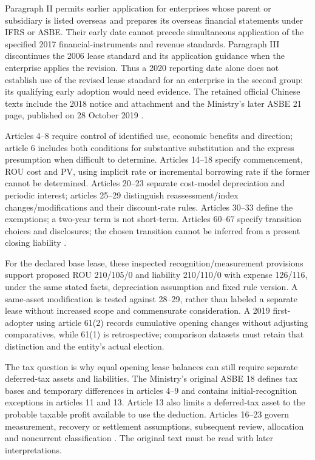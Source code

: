 Paragraph II permits earlier application for enterprises whose parent or subsidiary is listed overseas and prepares its overseas financial statements under IFRS or ASBE. Their early date cannot precede simultaneous application of the specified 2017 financial-instruments and revenue standards. Paragraph III discontinues the 2006 lease standard and its application guidance when the enterprise applies the revision. Thus a 2020 reporting date alone does not establish use of the revised lease standard for an enterprise in the second group: its qualifying early adoption would need evidence. The retained official Chinese texts include the 2018 notice and attachment and the Ministry's later ASBE 21 page, published on 28 October 2019 \citep{moflease2018,mofasbe21}.

Articles 4--8 require control of identified use, economic benefits and direction; article 6 includes both conditions for substantive substitution and the express presumption when difficult to determine. Articles 14--18 specify commencement, ROU cost and PV, using implicit rate or incremental borrowing rate if the former cannot be determined. Articles 20--23 separate cost-model depreciation and periodic interest; articles 25--29 distinguish reassessment/index changes/modifications and their discount-rate rules. Articles 30--33 define the exemptions; a two-year term is not short-term. Articles 60--67 specify transition choices and disclosures; the chosen transition cannot be inferred from a present closing liability \citep[attached standard, arts.\ 4--8, 14--33, 60--67]{moflease2018}.

For the declared base lease, these inspected recognition/measurement provisions support proposed ROU 210/105/0 and liability 210/110/0 with expense 126/116, under the same stated facts, depreciation assumption and fixed rule version. A same-asset modification is tested against 28--29, rather than labeled a separate lease without increased scope and commensurate consideration. A 2019 first-adopter using article 61(2) records cumulative opening changes without adjusting comparatives, while 61(1) is retrospective; comparison datasets must retain that distinction and the entity's actual election.

The tax question is why equal opening lease balances can still require separate deferred-tax assets and liabilities. The Ministry's original ASBE 18 defines tax bases and temporary differences in articles 4--9 and contains initial-recognition exceptions in articles 11 and 13. Article 13 also limits a deferred-tax asset to the probable taxable profit available to use the deduction. Articles 16--23 govern measurement, recovery or settlement assumptions, subsequent review, allocation and noncurrent classification \citep{mofasbe18}. The original text must be read with later interpretations.

